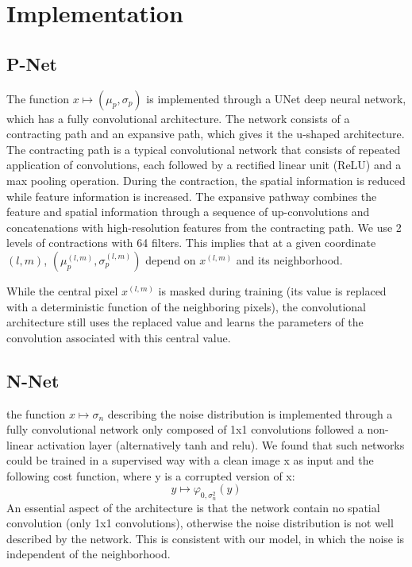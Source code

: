 \documentclass[review]{cvpr}
\begin{document}

%

\section{Implementation}
\subsection{P-Net}
The function $x\mapsto (\mu_p , \sigma_p)$ is implemented through a UNet \cite{ronneberger2015u} deep neural network, which has a fully convolutional architecture.
The network consists of a contracting path and an expansive path, which gives it the u-shaped architecture. The contracting path is a typical convolutional network that consists of repeated application of convolutions, each followed by a rectified linear unit (ReLU) and a max pooling operation. During the contraction, the spatial information is reduced while feature information is increased. The expansive pathway combines the feature and spatial information through a sequence of up-convolutions and concatenations with high-resolution features from the contracting path.
We use 2 levels of contractions with 64 filters.
This implies that at a given coordinate $(l,m)$, $(\mu_p^{(l,m)}, \sigma_p^{(l,m)})$ depend on $x^{(l,m)}$ and its neighborhood.

While the central pixel $x^{(l,m)}$ is masked during training (its value is replaced with a deterministic function of the neighboring pixels), the convolutional architecture still uses the replaced value and learns the parameters of the convolution associated with this central value.

\subsection{N-Net}
the function $x\mapsto \sigma_n$ describing the noise distribution is implemented through a fully convolutional network only composed of 1x1 convolutions followed a non-linear activation layer (alternatively tanh and relu).
We found that such networks could be trained in a supervised way with a clean image x as input and the following cost function, where y is a corrupted version of x:
$$
y\mapsto \varphi_{0,\sigma_n^2}(y)
$$
An essential aspect of the architecture is that the network contain no spatial convolution (only 1x1 convolutions), otherwise the noise distribution is not well described by the network. This is consistent with our model, in which the noise is independent of the neighborhood.
\end{document}
